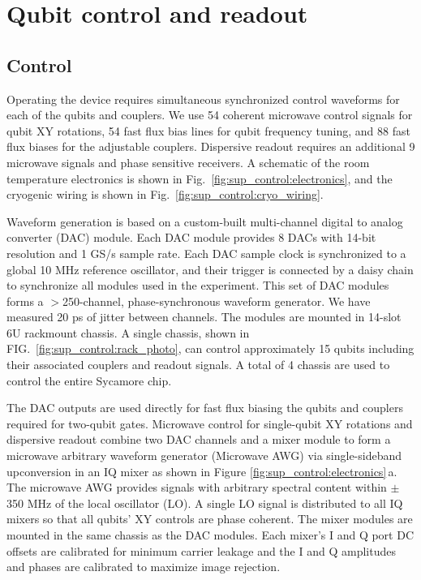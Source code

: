 \section{Qubit control and readout} \label{sec:control}

\subsection{Control}

Operating the device requires simultaneous synchronized control waveforms for each of the qubits and couplers.
We use 54 coherent microwave control signals for qubit XY rotations, 54 fast flux bias lines for qubit frequency tuning, and 88 fast flux biases for the adjustable couplers.
Dispersive readout requires an additional 9 microwave signals and phase sensitive receivers.
A schematic of the room temperature electronics is shown in Fig.~\ref{fig:sup_control:electronics}, and the cryogenic wiring is shown in Fig.~\ref{fig:sup_control:cryo_wiring}.

Waveform generation is based on a custom-built multi-channel digital to analog converter (DAC) module.
Each DAC module provides 8 DACs with 14-bit resolution and 1 GS/s sample rate.
Each DAC sample clock is synchronized to a global 10 MHz reference oscillator, and their trigger is connected by a daisy chain to synchronize all modules used in the experiment.
This set of DAC modules forms a $>$250-channel, phase-synchronous waveform generator.
We have measured 20 ps of jitter between channels.
The modules are mounted in 14-slot 6U rackmount chassis.
A single chassis, shown in FIG.~\ref{fig:sup_control:rack_photo}, can control approximately 15 qubits including their associated couplers and readout signals.
A total of 4 chassis are used to control the entire Sycamore chip.

The DAC outputs are used directly for fast flux biasing the qubits and couplers required for two-qubit gates.
Microwave control for single-qubit XY rotations and dispersive readout combine two DAC channels and a mixer module to form a microwave arbitrary waveform generator (Microwave AWG) via single-sideband upconversion in an IQ mixer as shown in Figure \ref{fig:sup_control:electronics}\,a.
The microwave AWG provides signals with arbitrary spectral content within $\pm$350 MHz of the local oscillator (LO).
A single LO signal is distributed to all IQ mixers so that all qubits' XY controls are phase coherent.
The mixer modules are mounted in the same chassis as the DAC modules.
Each mixer's I and Q port DC offsets are calibrated for minimum carrier leakage and the I and Q amplitudes and phases are calibrated to maximize image rejection.

